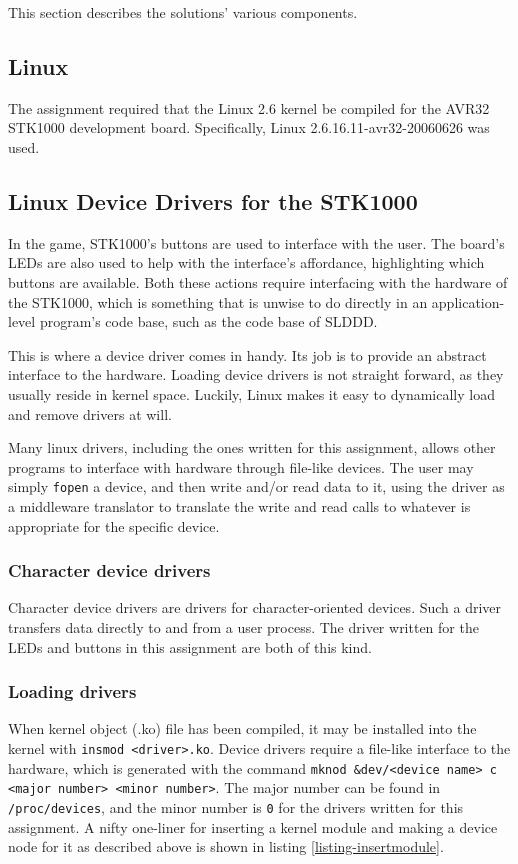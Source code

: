 This section describes the solutions' various components.

\subsection{Linux}
The assignment required that the Linux 2.6 kernel be compiled for the AVR32 STK1000 development board.
Specifically, Linux 2.6.16.11-avr32-20060626 was used.

\subsection{Linux Device Drivers for the STK1000}
In the game, STK1000's buttons are used to interface with the user.
The board's LEDs are also used to help with the interface's affordance, highlighting which buttons are available.
Both these actions require interfacing with the hardware of the STK1000, which is something that is unwise to do directly in an application-level program's code base, such as the code base of SLDDD.

This is where a device driver comes in handy. Its job is to provide an abstract interface to the hardware.
Loading device drivers is not straight forward, as they usually reside in kernel space.
Luckily, Linux makes it easy to dynamically load and remove drivers at will.

Many linux drivers, including the ones written for this assignment, allows other programs to interface with hardware through file-like devices.
The user may simply \texttt{fopen} a device, and then write and/or read data to it, using the driver as a middleware translator to translate the write and read calls to whatever is appropriate for the specific device.
\subsubsection{Character device drivers}
    Character device drivers are drivers for character-oriented devices.
    Such a driver transfers data directly to and from a user process.
    The driver written for the LEDs and buttons in this assignment are both of this kind.
\subsubsection{Loading drivers}
When kernel object (.ko) file has been compiled, it may be installed into the kernel with \texttt{insmod <driver>.ko}.
Device drivers require a file-like interface to the hardware, which is generated with the command \texttt{mknod \&dev/<device name> c <major number> <minor number>}.
The major number can be found in \texttt{/proc/devices}, and the minor number is \texttt{0} for the drivers written for this assignment.
A nifty one-liner for inserting a kernel module and making a device node for it as described above is shown in listing \ref{listing-insertmodule}.

